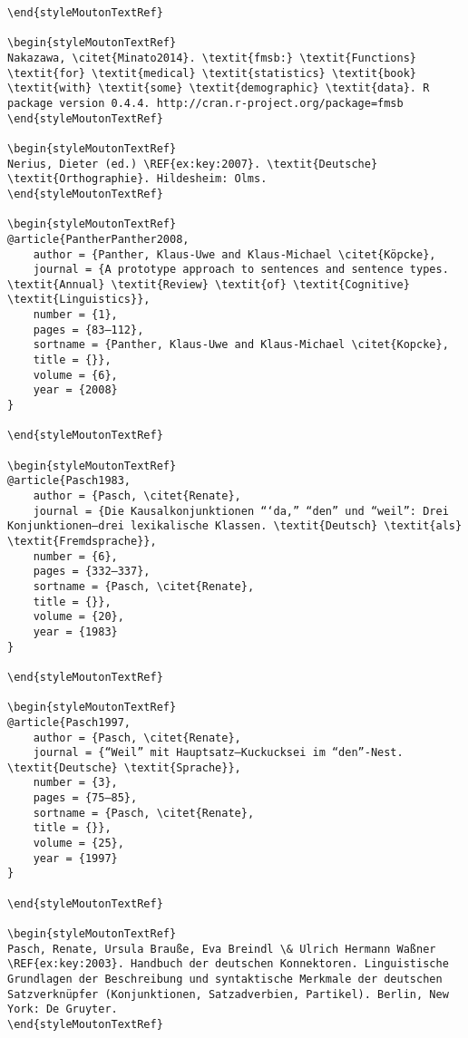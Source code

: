 \begin{styleMoutonHeadingRef}
\begin{verbatim}
\end{styleMoutonTextRef}

\begin{styleMoutonTextRef}
Nakazawa, \citet{Minato2014}. \textit{fmsb:} \textit{Functions} \textit{for} \textit{medical} \textit{statistics} \textit{book} \textit{with} \textit{some} \textit{demographic} \textit{data}. R package version 0.4.4. http://cran.r-project.org/package=fmsb
\end{styleMoutonTextRef}

\begin{styleMoutonTextRef}
Nerius, Dieter (ed.) \REF{ex:key:2007}. \textit{Deutsche} \textit{Orthographie}. Hildesheim: Olms.
\end{styleMoutonTextRef}

\begin{styleMoutonTextRef}
@article{PantherPanther2008,
	author = {Panther, Klaus-Uwe and Klaus-Michael \citet{Köpcke},
	journal = {A prototype approach to sentences and sentence types. \textit{Annual} \textit{Review} \textit{of} \textit{Cognitive} \textit{Linguistics}},
	number = {1},
	pages = {83–112},
	sortname = {Panther, Klaus-Uwe and Klaus-Michael \citet{Kopcke},
	title = {}},
	volume = {6},
	year = {2008}
}

\end{styleMoutonTextRef}

\begin{styleMoutonTextRef}
@article{Pasch1983,
	author = {Pasch, \citet{Renate},
	journal = {Die Kausalkonjunktionen “‘da,” “den” und “weil”: Drei Konjunktionen—drei lexikalische Klassen. \textit{Deutsch} \textit{als} \textit{Fremdsprache}},
	number = {6},
	pages = {332–337},
	sortname = {Pasch, \citet{Renate},
	title = {}},
	volume = {20},
	year = {1983}
}

\end{styleMoutonTextRef}

\begin{styleMoutonTextRef}
@article{Pasch1997,
	author = {Pasch, \citet{Renate},
	journal = {“Weil” mit Hauptsatz—Kuckucksei im “den”-Nest. \textit{Deutsche} \textit{Sprache}},
	number = {3},
	pages = {75–85},
	sortname = {Pasch, \citet{Renate},
	title = {}},
	volume = {25},
	year = {1997}
}

\end{styleMoutonTextRef}

\begin{styleMoutonTextRef}
Pasch, Renate, Ursula Brauße, Eva Breindl \& Ulrich Hermann Waßner \REF{ex:key:2003}. Handbuch der deutschen Konnektoren. Linguistische Grundlagen der Beschreibung und syntaktische Merkmale der deutschen Satzverknüpfer (Konjunktionen, Satzadverbien, Partikel). Berlin, New York: De Gruyter.
\end{styleMoutonTextRef}


\end{verbatim}
\end{styleMoutonHeadingRef}
